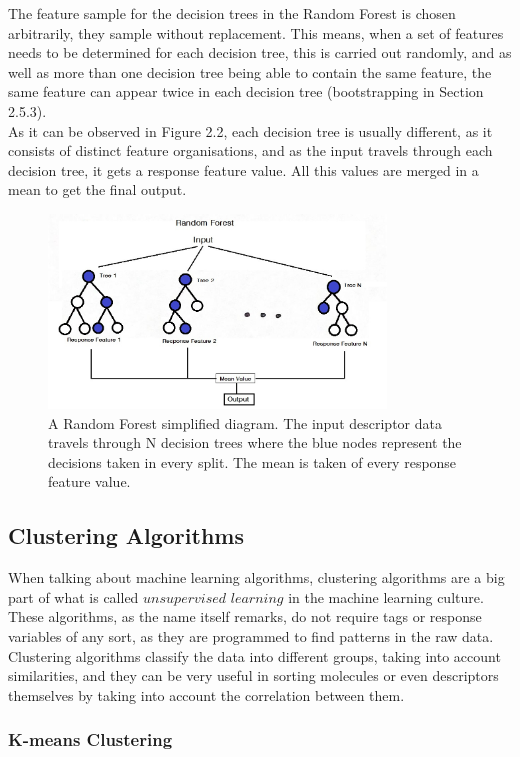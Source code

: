 The feature sample for the decision trees in the Random Forest is chosen arbitrarily, they sample without replacement. This means, when a set of features needs to be determined for each decision tree, this is carried out randomly, and as well as more than one decision tree being able to contain the same feature, the same feature can appear twice in each decision tree (bootstrapping in Section 2.5.3).\\

As it can be observed in Figure 2.2, each decision tree is usually different, as it consists of distinct feature organisations, and as the input travels through each decision tree, it gets a response feature value. All this values are merged in a mean to get the final output. 
\begin{figure}[h!]
    \centering
    \includegraphics[width=0.8\textwidth]{Images/Methods/RFout.jpeg}
    \caption{A Random Forest simplified diagram. The input descriptor data travels through N decision trees where the blue nodes represent the decisions taken in every split. The mean is taken of every response feature value.}
\end{figure} 
\subsection{Clustering Algorithms}
When talking about machine learning algorithms, clustering algorithms are a big part of what is called $unsupervised$ $learning$ in the machine learning culture. These algorithms, as the name itself remarks, do not require tags or response variables of any sort, as they are programmed to find patterns in the raw data. Clustering algorithms classify the data into different groups, taking into account similarities, and they can be very useful in sorting molecules or even descriptors themselves by taking into account the correlation between them.

\subsubsection{K-means Clustering}

